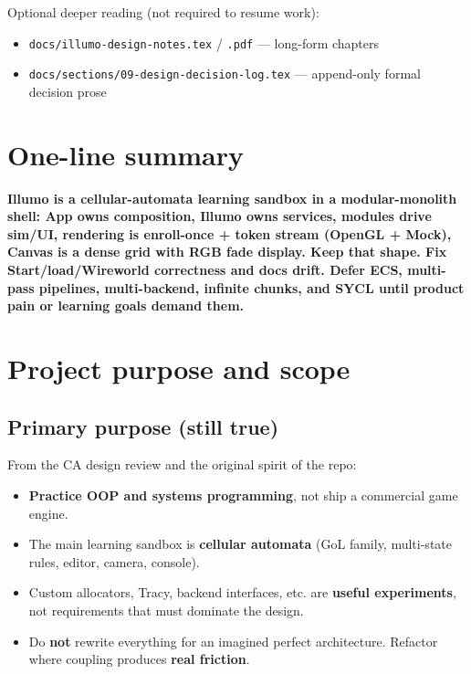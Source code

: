 \documentclass[10pt,a4paper]{article}
\begin{document}
\noindent Optional deeper reading (not required to resume work):
\begin{itemize}
    \item \texttt{docs/illumo-design-notes.tex} / \texttt{.pdf} --- long-form chapters
    \item \texttt{docs/sections/09-design-decision-log.tex} --- append-only formal decision prose
\end{itemize}

\vspace{0.5em}
\tableofcontents
\newpage

\section{One-line summary}
\textbf{Illumo is a cellular-automata learning sandbox in a modular-monolith shell: App owns composition, Illumo owns services, modules drive sim/UI, rendering is enroll-once + token stream (OpenGL + Mock), Canvas is a dense grid with RGB fade display. Keep that shape. Fix Start/load/Wireworld correctness and docs drift. Defer ECS, multi-pass pipelines, multi-backend, infinite chunks, and SYCL until product pain or learning goals demand them.}

\section{Project purpose and scope}

\subsection{Primary purpose (still true)}
From the CA design review and the original spirit of the repo:
\begin{itemize}
    \item \textbf{Practice OOP and systems programming}, not ship a commercial game engine.
    \item The main learning sandbox is \textbf{cellular automata} (GoL family, multi-state rules, editor, camera, console).
    \item Custom allocators, Tracy, backend interfaces, etc. are \textbf{useful experiments}, not requirements that must dominate the design.
    \item Do \textbf{not} rewrite everything for an imagined perfect architecture. Refactor where coupling produces \textbf{real friction}.
\end{itemize}
\end{document}
